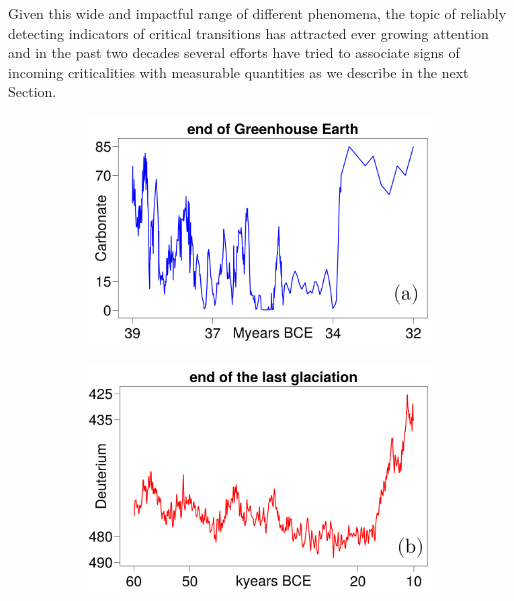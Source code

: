 \documentclass[../main.tex]{subfiles}
\begin{document}
Given this wide and impactful range of different phenomena, the topic of reliably detecting indicators of critical transitions has attracted ever growing attention and in the past two decades several efforts have tried to associate signs of incoming criticalities with measurable quantities as we describe in the next Section.
\begin{figure}[H]
    \centering 
    \begin{subfigure}[b]{0.325\textwidth}
        \centering 
        \includegraphics[keepaspectratio, width = \linewidth]{../figures/fig1.1.1.png}
        \label{fig1.1.1}
    \end{subfigure}
    \hfill
    \begin{subfigure}[b]{0.325\textwidth}
        \centering 
        \includegraphics[keepaspectratio, width = \linewidth]{../figures/fig1.1.2.png}
        \label{fig1.1.2}
    \end{subfigure}

\end{figure}
\end{document}
